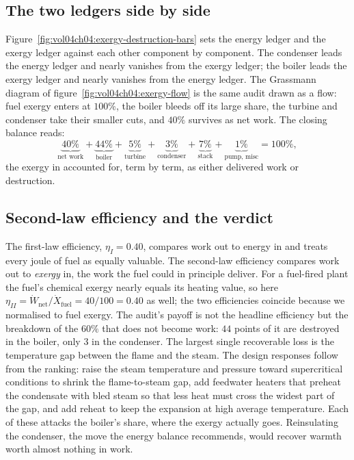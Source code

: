\subsection{The two ledgers side by side}

Figure~\ref{fig:vol04ch04:exergy-destruction-bars} sets the energy ledger
and the exergy ledger against each other component by component. The
condenser leads the energy ledger and nearly vanishes from the exergy
ledger; the boiler leads the exergy ledger and nearly vanishes from the
energy ledger. The Grassmann diagram of
figure~\ref{fig:vol04ch04:exergy-flow} is the same audit drawn as a flow:
fuel exergy enters at $100\%$, the boiler bleeds off its large share, the
turbine and condenser take their smaller cuts, and $40\%$ survives as net
work. The closing balance reads:
\[
\underbrace{40\%}_{\text{net work}} +
\underbrace{44\%}_{\text{boiler}} +
\underbrace{5\%}_{\text{turbine}} +
\underbrace{3\%}_{\text{condenser}} +
\underbrace{7\%}_{\text{stack}} +
\underbrace{1\%}_{\text{pump, misc}}
= 100\%,
\]
the exergy in accounted for, term by term, as either delivered work or
destruction.

\subsection{Second-law efficiency and the verdict}

The first-law efficiency, $\eta_I = 0.40$, compares work out to energy
in and treats every joule of fuel as equally valuable. The second-law
efficiency compares work out to \emph{exergy} in, the work the fuel could
in principle deliver. For a fuel-fired plant the fuel's chemical exergy
nearly equals its heating value, so here $\eta_{II} = \dot W_{\text{net}}/
\dot X_{\text{fuel}} = 40/100 = 0.40$ as well; the two efficiencies
coincide because we normalised to fuel exergy. The audit's payoff is not
the headline efficiency but the breakdown of the $60\%$ that does not
become work: $44$ points of it are destroyed in the boiler, only $3$ in
the condenser. The largest single recoverable loss is the temperature
gap between the flame and the steam. The design responses follow from the
ranking: raise the steam temperature and pressure toward supercritical
conditions to shrink the flame-to-steam gap, add feedwater heaters that
preheat the condensate with bled steam so that less heat must cross the
widest part of the gap, and add reheat to keep the expansion at high
average temperature. Each of these attacks the boiler's share, where the
exergy actually goes. Reinsulating the condenser, the move the energy
balance recommends, would recover warmth worth almost nothing in work.

